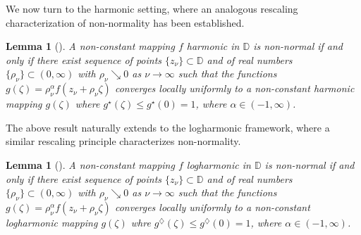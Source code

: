 \documentclass[10pt,a4paper]{amsart}
\newtheorem{lemma}[theorem]{Lemma}
\numberwithin{equation}{section}
\begin{document}
We now turn to the harmonic setting, where an analogous rescaling characterization of non-normality has been established.
\begin{lemma}[{\cite[Theorem 1.2]{bharti-ronhapnhm-2025}}]\label{L-nnhm} 
A non-constant mapping $f$ harmonic in $\mathbb D$ is non-normal if and only if there exist sequence of
points $\{z_{\nu}\}\subset\mathbb D$ and of real numbers $\{\rho_{\nu} \}\subset(0,\infty)$ with 
$\rho_{\nu} \searrow 0$ as $\nu\to\infty$ such that the functions $g(\zeta)=\rho_{\nu} ^{\alpha}f(z_{\nu}+\rho_{\nu} \zeta)$ converges 
locally uniformly to a non-constant harmonic mapping $g(\zeta)$ where $g^{\star}(\zeta)\leq g^\star(0)=1$, where $\alpha\in(-1,\infty)$. 
\end{lemma}
The above result naturally extends to the logharmonic framework, where a similar rescaling principle characterizes non-normality.
\begin{lemma}[{\cite[Theorem 2.2]{ahamed-ncflm-2025}}] \label{L-nnlhm} 
A non-constant mapping $f$ logharmonic in $\mathbb D$ is non-normal if and only if there exist sequence of points $\{z_{\nu}\}\subset\mathbb D$ and of real 
numbers $\{\rho_{\nu} \}\subset(0,\infty)$ with $\rho_{\nu} \searrow 0$ as $\nu\to\infty$ such that the functions $g(\zeta)=\rho_{\nu} ^{\alpha}f(z_{\nu}+\rho_{\nu} \zeta)$ converges 
locally uniformly to a non-constant logharmonic mapping $g(\zeta)$ whre $g^{\diamondsuit}(\zeta)\leq g^\diamondsuit(0)=1$, where $\alpha\in(-1,\infty)$. 
\end{lemma}
\end{document}
